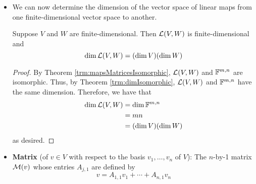 \documentclass[../main.tex]{subfiles}
\begin{document}
\begin{itemize}
\begin{theorem}
\begin{proof}
            \begin{equation*}
                Tv_k = 0w_1+\cdots+0w_m = 0
            \end{equation*}
            for all $k=1,\dots,n$. But since $v_1,\dots,b_n$ is a basis of $V$, this implies that $T=0$ (0 denoting the zero transformation), as desired.\par
            To show that $\mathcal{M}$ is surjective, it will suffice to verify that $\range\mathcal{M}=\F^{m,n}$. Clearly $\range\mathcal{M}\subset\F^{m,n}$, so we focus on the other direction. Let $A\in\F^{m,n}$ be arbitrary. Define $T\in\lin{V}{W}$ by
            \begin{equation*}
                Tv_k = \sum_{j=1}^mA_{j,k}w_j
            \end{equation*}
            for $k=1,\dots,n$. It follows by the definition of a matrix of a linear transformation that $\mat{T}=A$, as desired.
        \end{proof}
    \end{theorem}
    \item We can now determine the dimension of the vector space of linear maps from one finite-dimensional vector space to another.
    \begin{theorem}\label{trm:dimLVW}
        Suppose $V$ and $W$ are finite-dimensional. Then $\mathcal{L}(V,W)$ is finite-dimensional and
        \begin{equation*}
            \dim\mathcal{L}(V,W) = (\dim V)(\dim W)
        \end{equation*}
        \begin{proof}
            By Theorem \ref{trm:mapsMatricesIsomorphic}, $\mathcal{L}(V,W)$ and $\mathbb{F}^{m,n}$ are isomorphic. Thus, by Theorem \ref{trm:dimIsomorphic}, $\mathcal{L}(V,W)$ and $\mathbb{F}^{m,n}$ have the same dimension. Therefore, we have that
            \begin{align*}
                \dim\mathcal{L}(V,W) &= \dim\mathbb{F}^{m,n}\\
                &= mn\\
                &= (\dim V)(\dim W)
            \end{align*}
            as desired.
        \end{proof}
    \end{theorem}
    \item \textbf{Matrix} (of $v\in V$ with respect to the basis $v_1,\dots,v_n$ of $V$): The $n$-by-1 matrix $\mathcal{M}(v)$ whose entries $A_{j,1}$ are defined by
    \begin{equation*}
        v = A_{1,1}v_1+\cdots+A_{n,1}v_n

\end{equation*}
\end{itemize}
\end{document}
